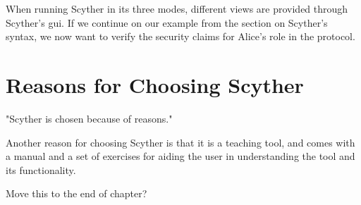 When running Scyther in its three modes, different views are provided through Scyther's \gls{gui}. If we continue on our example from the section on Scyther's syntax, we now want to verify the security claims for Alice's role in the protocol.



\section{Reasons for Choosing Scyther}

"Scyther is chosen because of reasons."

Another reason for choosing Scyther is that it is a teaching tool, and comes with a manual and a set of exercises for aiding the user in understanding the tool and its functionality.

Move this to the end of chapter?